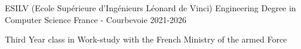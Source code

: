 

\begin{cventries}

  \cventry
    {ESILV (Ecole Supérieure d'Ingénieurs Léonard de Vinci)} %
    {Engineering Degree in Computer Science} %
    {France - Courbevoie} %
    {2021-2026} %
    {
      \begin{cvitems} %
        \item {Third Year class in Work-study with the French Ministry of the armed Force}
      \end{cvitems}
    }
    {}

\end{cventries}
